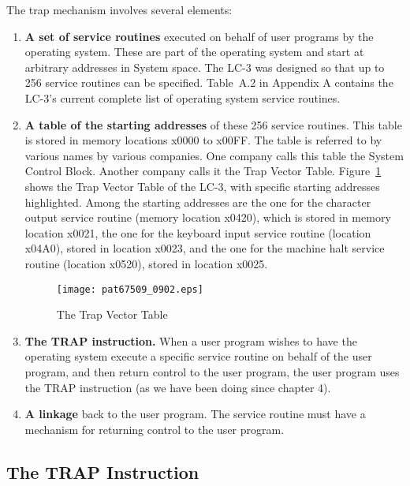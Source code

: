 \documentclass{patt}
\begin{document}
The trap mechanism involves several elements:
\begin{enumerate}
\item {\bf A set of service routines} executed on behalf of user
  programs by the operating system.  These are part of the operating
  system and start at arbitrary addresses in System space. The LC-3 was
  designed so that up to 256 service routines can be specified.
  Table~A.2 in Appendix A contains the LC-3's current complete list of
  operating system service routines.

\item {\bf A table of the starting addresses} of these 256 service
  routines.  This table is stored in memory locations x0000 to x00FF.
  The table is referred to by various names by various companies.  One
  company calls this table the System Control Block.
  Another company
  calls it the Trap Vector Table.  Figure~\ref{fig:trap_vector_table}
  shows the Trap Vector Table of the LC-3, with
  specific starting addresses highlighted.  Among the starting
  addresses are the one for the character output service routine
  (memory location x0420), which is stored in memory location x0021, 
  the one for the keyboard input service routine (location x04A0), 
  stored in location x0023, and the one for the machine halt service 
  routine (location x0520), stored in location x0025.

\begin{figure}[h!]
\centerline{\texttt{[image: pat67509\_0902.eps]}}
\caption{The Trap Vector Table}
\label{fig:trap_vector_table}
\end{figure}

\item {\bf The TRAP instruction.} When a user program wishes to have
  the operating system execute a specific service routine on behalf of
  the user program, and then return control to the user program, the
  user program uses the TRAP instruction (as we have been doing since
  chapter 4).

\item {\bf A linkage} back to the user program.  The service routine
  must have a mechanism for returning control to the user program.
\end{enumerate}

\FloatBarrier
\subsection{The TRAP Instruction}
\end{document}
